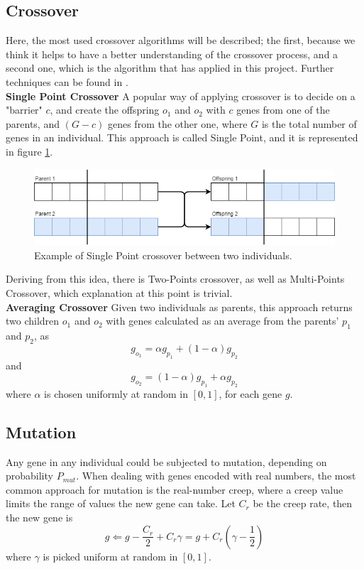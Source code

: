 \subsection{Crossover}\label{subsec:cross}
Here, the most used crossover algorithms will be described; the first, because we think it helps to have a better understanding of the crossover process, and a second one, which is the algorithm that has applied in this project. Further techniques can be found in \cite{umbarkar2015crossover}.\\
\textbf{Single Point Crossover}\qquad
A popular way of applying crossover is to decide on a "barrier" $c$, and create the offspring $o_1$ and $o_2$ with $c$ genes from one of the parents, and $(G-c)$ genes from the other one, where $G$ is the total number of genes in an individual. This approach is called Single Point, and it is represented in figure \ref{fig:crosssp}.
\begin{figure}[H]
    \centering 
    \includegraphics[scale=0.5]{figure/Crossoversinglepoint.png}
    \caption{Example of Single Point crossover between two individuals.}
    \label{fig:crosssp}
\end{figure}
Deriving from this idea, there is Two-Points crossover, as well as Multi-Points Crossover, which explanation at this point is trivial.\\
\textbf{Averaging Crossover}\qquad
Given two individuals as parents, this approach returns two children $o_1$ and $o_2$ with genes calculated as an average from the parents' $p_1$ and $p_2$, as $$g_{o_1} = \alpha g_{p_1} + (1-\alpha)g_{p_2}$$ and $$g_{o_2} = (1-\alpha) g_{p_1} + \alpha g_{p_2}$$ where $\alpha$ is chosen uniformly at random in $[0,1]$\cite{ladkany2012genetic}, for each gene $g$.
\subsection{Mutation}\label{subsec:mut}
Any gene in any individual could be subjected to mutation, depending on probability $P_{mut}$. When dealing with genes encoded with real numbers, the most common approach for mutation is the real-number creep, where a creep value limits the range of values the new gene can take. Let $C_r$ be the creep rate, then the new gene is $$g\Leftarrow g-\frac{C_r}{2}+C_r\gamma=g+C_r(\gamma-\frac{1}{2})$$ where $\gamma$ is picked uniform at random in $[0,1]$\cite[pp.~53-55]{wahde2008biologically}.
